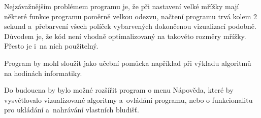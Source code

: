 \documentclass[12pt]{report}			%
\begin{document}
		Nejzávažnějším problémem programu je, že při nastavení velké mřížky mají některé funkce programu poměrně velkou odezvu, načtení programu trvá kolem 2 sekund a~přebarvení všech políček vybarvených dokončenou vizualizací podobně. Důvodem je, že kód není vhodně optimalizovaný na takovéto rozměry mřížky. Přesto je i~na nich použitelný.
		
		Program by mohl sloužit jako učební pomůcka například při výkladu algoritmů na hodinách informatiky.
		
		Do budoucna by bylo možné rozšířit program o menu Nápověda, které by vysvětlovalo vizualizované algoritmy a~ovládání programu, nebo o funkcionalitu pro ukládání a~nahrávání vlastních bludišť.
	
	
	\nocite{*}
    \printbibliography					%
    \printglossary[title={Zkratky}]		%
    \listoffigures						%
    \listoftables						%
	\listofalgorithms
\end{document}

